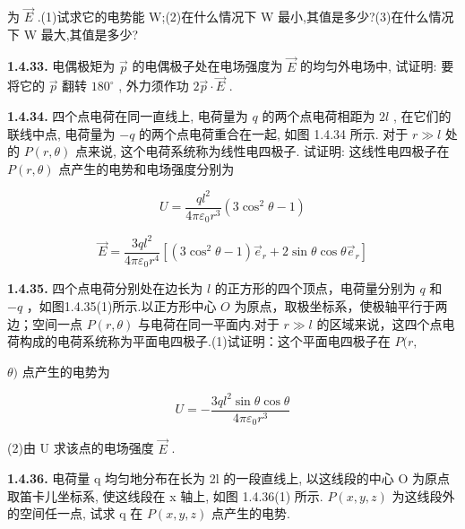 为 $\vec{E}$ .(1)试求它的电势能 W;(2)在什么情况下 W 最小,其值是多少?(3)在什么情况下 W 最大,其值是多少?

\vfill

\newpage
\textbf{1.4.33.} 电偶极矩为 $\vec{p}$ 的电偶极子处在电场强度为 $\vec{E}$ 的均匀外电场中, 试证明: 要将它的 $\vec{p}$ 翻转 $180^{\circ}$ , 外力须作功 $2\vec{p} \cdot \vec{E}$ .

\vfill

\textbf{1.4.34.} 四个点电荷在同一直线上, 电荷量为 $q$ 的两个点电荷相距为 $2l$ , 在它们的联线中点, 电荷量为 $-q$ 的两个点电荷重合在一起, 如图 1.4.34 所示. 对于 $r \gg l$ 处的 $P(r, \theta)$ 点来说, 这个电荷系统称为线性电四极子. 试证明: 这线性电四极子在 $P(r, \theta)$ 点产生的电势和电场强度分别为

$$
U = \frac {q l ^ {2}}{4 \pi \varepsilon_ {0} r ^ {3}} (3 \cos^ {2} \theta - 1)
$$

$$
\vec{E} = \frac {3 q l ^ {2}}{4 \pi \varepsilon_ {0} r ^ {4}} \left[ (3 \cos^ {2} \theta - 1) \vec{e}_{r} + 2 \sin \theta \cos \theta \vec{e}_{r} \right]
$$


\begin{center}
\end{center}

\vfill

\newpage
\textbf{1.4.35.} 四个点电荷分别处在边长为 $l$ 的正方形的四个顶点，电荷量分别为 $q$ 和 $-q$ ，如图1.4.35(1)所示.以正方形中心 $O$ 为原点，取极坐标系，使极轴平行于两边；空间一点 $P(r,\theta)$ 与电荷在同一平面内.对于 $r\gg l$ 的区域来说，这四个点电荷构成的电荷系统称为平面电四极子.(1)试证明：这个平面电四极子在 $P(r,$

$\theta)$ 点产生的电势为

$$
U = - \frac {3 q l ^ {2} \sin \theta \cos \theta}{4 \pi \varepsilon_ {0} r ^ {3}}
$$



(2)由 U 求该点的电场强度 $\vec{E}$ .

\begin{center}
\end{center}


\vfill

\textbf{1.4.36.} 电荷量 q 均匀地分布在长为 2l 的一段直线上, 以这线段的中心 O 为原点取笛卡儿坐标系, 使这线段在 x 轴上, 如图 1.4.36(1) 所示. $P(x,y,z)$ 为这线段外的空间任一点, 试求 q 在 $P(x,y,z)$ 点产生的电势.

\vfill

